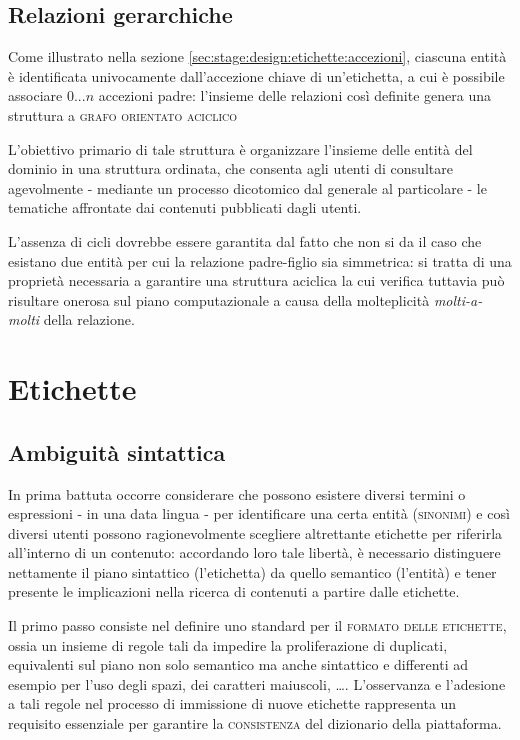 \documentclass[10pt,a4paper,headinclude,footinclude,hidelinks]{scrreprt} %
\begin{document}
	\subsection{Relazioni gerarchiche}
	
	Come illustrato nella sezione \ref{sec:stage:design:etichette:accezioni}, ciascuna entità è identificata univocamente dall'accezione chiave di un'etichetta, a cui è possibile associare $0...n$ accezioni padre: l'insieme delle relazioni così definite genera una struttura a \textsc{grafo orientato aciclico}

	L'obiettivo primario di tale struttura è organizzare l'insieme delle entità del dominio in una struttura ordinata, che consenta agli utenti di consultare agevolmente - mediante un processo dicotomico dal generale al particolare - le tematiche affrontate dai contenuti pubblicati dagli utenti.

	L'assenza di cicli dovrebbe essere garantita dal fatto che non si da il caso che esistano due entità per cui la relazione padre-figlio sia simmetrica: si tratta di una proprietà necessaria a garantire una struttura aciclica la cui verifica tuttavia può risultare onerosa sul piano computazionale a causa della molteplicità \textit{molti-a-molti} della relazione.

	\section{Etichette}
	\label{sec:stage:design:etichette}

	\subsection{Ambiguità sintattica}
	In prima battuta occorre considerare che possono esistere diversi termini o espressioni - in una data lingua - per identificare una certa entità (\textsc{sinonimi}) e così diversi utenti possono ragionevolmente scegliere altrettante etichette per riferirla all'interno di un contenuto: accordando loro tale libertà, è necessario distinguere nettamente il piano sintattico (l'etichetta) da quello semantico (l'entità) e tener presente le implicazioni nella ricerca di contenuti a partire dalle etichette.

	Il primo passo consiste nel definire uno standard per il \textsc{formato delle etichette}, ossia un insieme di regole tali da impedire la proliferazione di duplicati, equivalenti sul piano non solo semantico ma anche sintattico e differenti ad esempio per l'uso degli spazi, dei caratteri maiuscoli, \ldots. L'osservanza e l'adesione a tali regole nel processo di immissione di nuove etichette rappresenta un requisito essenziale per garantire la \textsc{consistenza} del dizionario della piattaforma.
\end{document}

